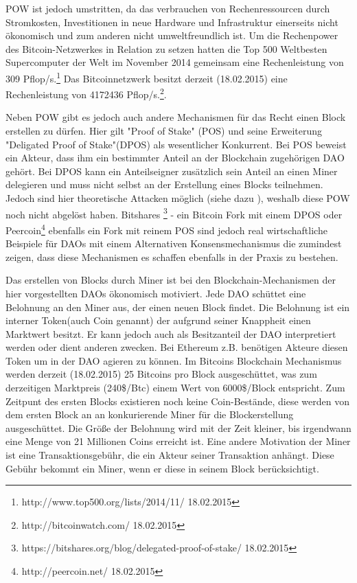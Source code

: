 \documentclass[a4paper,12pt]{report}
\begin{document}
POW ist jedoch umstritten, da das verbrauchen von Rechenressourcen durch Stromkosten, Investitionen in neue Hardware und Infrastruktur einerseits nicht ökonomisch und zum anderen nicht umweltfreundlich ist. Um die Rechenpower des Bitcoin-Netzwerkes in Relation zu setzen hatten die Top 500 Weltbesten Supercomputer der Welt im November 2014 gemeinsam eine Rechenleistung von 309 Pflop/s.\footnote{http://www.top500.org/lists/2014/11/ 18.02.2015} Das Bitcoinnetzwerk besitzt derzeit (18.02.2015) eine Rechenleistung von 4172436 Pflop/s.\footnote{http://bitcoinwatch.com/ 18.02.2015}.


Neben POW gibt es jedoch auch andere Mechanismen für das Recht einen Block erstellen zu dürfen. Hier gilt "Proof of Stake" (POS) und seine Erweiterung "Deligated Proof of Stake"(DPOS) als wesentlicher Konkurrent. Bei POS beweist ein Akteur, dass ihm ein bestimmter Anteil an der Blockchain zugehörigen DAO gehört. Bei  DPOS kann ein Anteilseigner zusätzlich sein Anteil an einen Miner delegieren und muss nicht selbst an der Erstellung eines Blocks teilnehmen. Jedoch sind hier theoretische Attacken möglich (siehe dazu \cite{EthereumBlogPOS} \cite{Vasant2015}), weshalb diese POW noch nicht abgelöst haben. Bitshares \footnote{https://bitshares.org/blog/delegated-proof-of-stake/ 18.02.2015} - ein Bitcoin Fork mit einem DPOS oder Peercoin\footnote{http://peercoin.net/ 18.02.2015} ebenfalls ein Fork mit reinem POS sind jedoch real wirtschaftliche Beispiele für DAOs mit einem Alternativen Konsensmechanismus die zumindest zeigen, dass diese Mechanismen es schaffen ebenfalls in der Praxis zu bestehen.

Das erstellen von Blocks durch Miner ist bei den Blockchain-Mechanismen der hier vorgestellten DAOs ökonomisch motiviert. Jede DAO schüttet eine Belohnung an den Miner aus, der einen neuen Block findet. Die Belohnung ist ein interner Token(auch Coin genannt) der aufgrund seiner Knappheit einen Marktwert besitzt. Er kann jedoch auch als Besitzanteil der DAO interpretiert werden oder dient anderen zwecken. Bei Ethereum z.B. benötigen Akteure diesen Token um in der DAO agieren zu können. Im Bitcoins Blockchain Mechanismus werden derzeit (18.02.2015) 25 Bitcoins pro Block ausgeschüttet, was zum derzeitigen Marktpreis (240\$/Btc) einem Wert von 6000\$/Block entspricht.  
Zum Zeitpunt des ersten Blocks existieren noch keine Coin-Bestände, diese werden von dem ersten Block an an konkurierende Miner für die Blockerstellung ausgeschüttet. Die Größe der Belohnung wird mit der Zeit kleiner, bis irgendwann eine Menge von 21 Millionen Coins erreicht ist. Eine andere Motivation der Miner ist eine Transaktionsgebühr, die ein Akteur seiner Transaktion anhängt. Diese Gebühr bekommt ein Miner, wenn er diese in seinem Block berücksichtigt.
\end{document}
